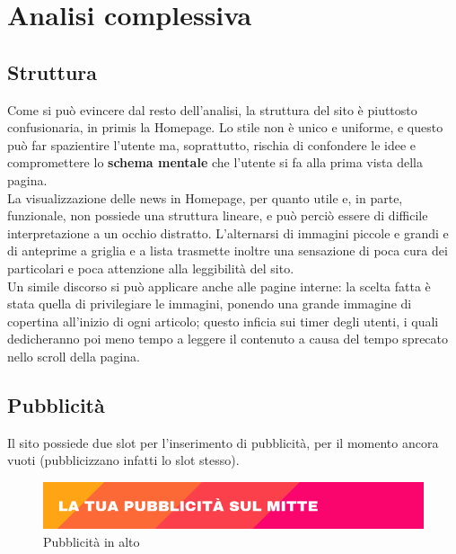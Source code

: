 \newpage
\section{Analisi complessiva}

\subsection{Struttura}
Come si può evincere dal resto dell'analisi, la struttura del sito è piuttosto confusionaria, in primis la Homepage. Lo stile non è unico e uniforme, e questo può far spazientire l'utente ma, soprattutto, rischia di confondere le idee e compromettere lo \textbf{schema mentale} che l'utente si fa alla prima vista della pagina. \\
La visualizzazione delle news in Homepage, per quanto utile e, in parte, funzionale, non possiede una struttura lineare, e può perciò essere di difficile interpretazione a un occhio distratto. L'alternarsi di immagini piccole e grandi e di anteprime a griglia e a lista trasmette inoltre una sensazione di poca cura dei particolari e poca attenzione alla leggibilità del sito. \\
Un simile discorso si può applicare anche alle pagine interne: la scelta fatta è stata quella di privilegiare le immagini, ponendo una grande immagine di copertina all'inizio di ogni articolo; questo inficia sui timer degli utenti, i quali dedicheranno poi meno tempo a leggere il contenuto a causa del tempo sprecato nello scroll della pagina.

\subsection{Pubblicità}
Il sito possiede due slot per l'inserimento di pubblicità, per il momento ancora vuoti (pubblicizzano infatti lo slot stesso).

\vspace{30pt}
\begin{figure}[htbp]
\begin{center}
\includegraphics[width=35em]{img/pubblicita1}
\caption{Pubblicità in alto}
\end{center}
\end{figure}
\vspace{30pt}

